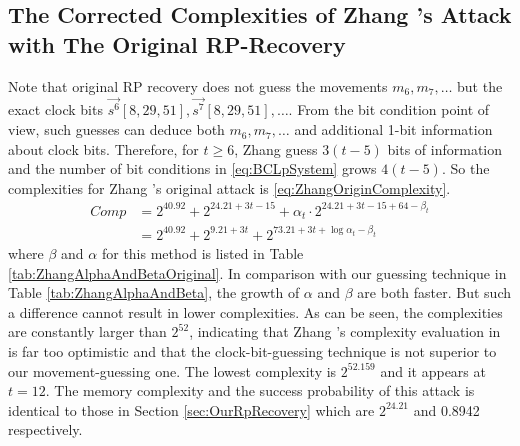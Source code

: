 \subsection{The Corrected Complexities of Zhang \etal's Attack with The Original RP-Recovery}\label{sec:ZhangRpRecovery}
Note that original RP recovery does not guess the movements $m_6,m_7,\ldots$ but the exact clock bits $\vec{s^6}[8,29,51], \vec{s^7}[8,29,51],\ldots$.
From the bit condition point of view, such guesses can deduce both $m_6,m_7,\ldots$ and additional 1-bit information about clock bits.
Therefore, for $t\geq 6$, Zhang \etal guess $3(t-5)$ bits of information and the number of bit conditions in \eqref{eq:BCLpSystem} grows $4(t-5)$.
So the complexities for Zhang \etal's original attack is \eqref{eq:ZhangOriginComplexity}.
\begin{equation}\label{eq:ZhangOriginComplexity}
\begin{aligned}
Comp&=2^{40.92}+2^{24.21+3t-15}+\alpha_t \cdot 2^{24.21+3t-15+64-\beta_t}\\
&=2^{40.92}+2^{9.21+3t}+2^{73.21+3t+\log \alpha_t -\beta_t}
\end{aligned}
\end{equation}
where $\beta$ and $\alpha$ for this method is listed in Table \ref{tab:ZhangAlphaAndBetaOriginal}.
In comparison with our guessing technique in Table \ref{tab:ZhangAlphaAndBeta}, the growth of $\alpha$ and $\beta$ are both faster.
But such a difference cannot result in lower complexities.
As can be seen, the complexities are constantly larger than $2^{52}$, indicating that Zhang \etal's complexity evaluation in \cite{AC:Zhang19} is far too optimistic and that the clock-bit-guessing technique is not superior to our movement-guessing one.
The lowest complexity is $2^{52.159}$ and it appears at $t=12$.
The memory complexity and the success probability of this attack is identical to those in  Section \ref{sec:OurRpRecovery} which are $2^{24.21}$ and 0.8942 respectively.

